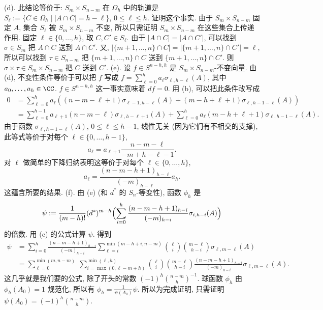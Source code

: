 \begin{solution}
(d). 此结论等价于: $S_m \times S_{n-m}$ 在 $\Omega_h$ 中的轨道是 $S_{\ell} := \{C \in \Omega_h \mid |A \cap C| = h - \ell\}$, $0 \leq \ell \leq h$. 证明这个事实. 由于 $S_m \times S_{n-m}$ 固定 $A$, 集合 $S_{\ell}$ 被 $S_m \times S_{n-m}$ 不变, 所以只需证明 $S_m \times S_{n-m}$ 在这些集合上传递作用. 固定 $\ell \in \{0, \ldots, h\}$, 取 $C, C' \in S_{\ell}$. 由于 $|A \cap C| = |A \cap C'|$, 可以找到 $\sigma \in S_m$ 把 $A \cap C$ 送到 $A \cap C'$. 又, $|\{m+1, \ldots, n\} \cap C| = |\{m+1, \ldots, n\} \cap C'| = \ell$, 所以可以找到 $\tau \in S_{n-m}$ 把 $\{m+1, \ldots, n\} \cap C$ 送到 $\{m+1, \ldots, n\} \cap C'$. 则 $\sigma \times \tau \in S_m \times S_{n-m}$ 把 $C$ 送到 $C'$.
(e). 设 $f \in S^{n-h,h}$ 是 $S_m \times S_{n-m}$-不变向量. 由 (d), 不变性条件等价于可以把 $f$ 写成 $f = \sum_{\ell=0}^h a_{\ell}\sigma_{\ell,h-\ell}(A)$, 其中 $a_0, \ldots, a_h \in \CC$. $f \in S^{n-h,h}$ 这一事实意味着 $df = 0$. 用 (b), 可以把此条件改写成
\begin{align*}
0 &= \sum_{\ell=0}^h a_{\ell}((n - m - \ell + 1)\sigma_{\ell-1,h-\ell}(A) + (m - h + \ell + 1)\sigma_{\ell,h-1-\ell}(A)) \\
&= \sum_{\ell=0}^{h-1}a_{\ell+1}(n - m - \ell)\sigma_{\ell,h-\ell+1}(A) + \sum_{\ell=0}^h a_{\ell}(m - h + \ell + 1)\sigma_{\ell,h-1-\ell}(A).
\end{align*}
由于函数 $\sigma_{\ell,h-1-\ell}(A)$, $0 \leq \ell \leq h - 1$, 线性无关 (因为它们有不相交的支撑), 此等式等价于对每个 $\ell \in \{0, \ldots, h-1\}$,
\[
a_{\ell} = a_{\ell+1}\frac{n-m-\ell}{-m+h-\ell-1}.
\]
对 $\ell$ 做简单的下降归纳表明这等价于对每个 $\ell \in \{0, \ldots, h\}$,
\[
a_{\ell} = \frac{(n - m - h + 1)_{h-\ell}}{(-m)_{h-\ell}}a_h.
\]
这蕴含所要的结果.
(f). 由 (e) (和 $d^*$ 的 $S_n$-等变性), 函数 $\phi_h$ 是
\[
\psi := \frac{1}{(m-h)!}(d^*)^{m-h}\Bigl(\sum_{i=0}^h\frac{(n - m - h + 1)_{h-i}}{(-m)_{h-i}}\sigma_{i,h-i}(A)\Bigr)
\]
的倍数. 用 (c) 的公式计算 $\psi$. 得到
\begin{align*}
\psi &= \sum_{i=0}^h\frac{(n - m - h + 1)_{h-i}}{(-m)_{h-i}}\sum_{\ell=i}^{\min(m-h+i,n-m)}\binom{\ell}{i}\binom{m-\ell}{h-i}\sigma_{\ell,m-\ell}(A) \\
&= \sum_{\ell=0}^{\min(m,n-m)}\ \sum_{i=\max(0,\ell-m+h)}^{\min(\ell,h)}\binom{\ell}{i}\binom{m-\ell}{h-i}\frac{(n-m-h+1)_{h-i}}{(-m)_{h-i}}\sigma_{\ell,m-\ell}(A).
\end{align*}
这几乎就是我们要的公式, 除了开头的常数 $(-1)^h\binom{n-m}{h}^{-1}$. 球函数 $\phi_h$ 由 $\phi_h(A_0) = 1$ 规范化, 所以有 $\phi_h = \frac{1}{\psi(A_0)}\psi$. 所以为完成证明, 只需证明 $\psi(A_0) = (-1)^h\binom{n-m}{h}$.

\end{solution}

